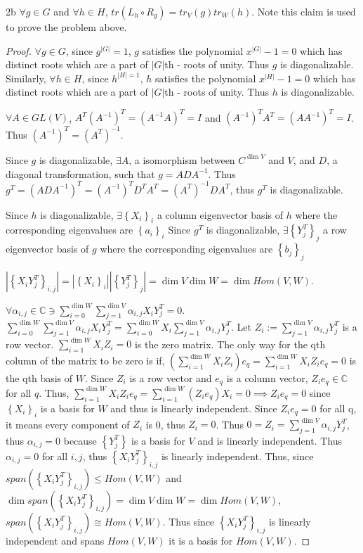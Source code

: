 \documentclass{article}
\newcommand{\C}{\mathbb{C}}
\begin{document}
\begin{claim}{2b}\label{Claim 2b.}
    $\forall g \in G$ and $\forall h \in H$, $tr(L_h \circ R_g) = tr_V(g)tr_W(h)$. Note this claim is used to prove the problem above.   
\end{claim}
\begin{proof}
    $\forall g \in G$, since $g^{|G|} = 1$, $g$ satisfies the polynomial $x^{|G|} - 1 = 0$ which has distinct roots which are a part of $|G|$th - roots of unity. Thus $g$ is diagonalizable. Similarly, $\forall h \in H$, since $h^{|H| = 1}$, $h$ satisfies the polynomial $x^{|H|} - 1 = 0$ which has distinct roots which are a part of $|G|$th - roots of unity. Thus $h$ is diagonalizable.
    
    $\forall A \in GL(V)$, $A^T (A^{-1})^T = (A^{-1}A)^T = I$ and $(A^{-1})^T A^T = (AA^{-1})^T = I$. Thus $(A^{-1})^T = (A^T)^{-1}$.    
    
    Since $g$ is diagonalizable, $\exists A$, a isomorphism between $C^{\dim V}$ and $V$, and $D$, a diagonal transformation, such that $g = ADA^{-1}$. Thus $g^T = (ADA^{-1})^T = (A^{-1})^T D^T A^{T} = (A^T)^{-1} D A^{T}$, thus $g^T$ is diagonalizable.

    Since $h$ is diagonalizable, $\exists \left\{  X_i\right\}_i$ a column eigenvector basis of $h$ where the corresponding eigenvalues are $\left\{ a_i \right\}_i$      
    Since $g^T$ is diagonalizable, $\exists \left\{ Y_j^T \right\}_j$ a row eigenvector basis of $g$ where the corresponding eigenvalues are $\left\{ b_j \right\}_j$
    
    $|\left\{ X_iY_j^T \right\}_{i, j}| = |\left\{ X_i \right\}_i| |\left\{ Y_j^T \right\}_j| = \dim V \dim W = \dim Hom(V, W)$. 
    
    $\forall \alpha_{i, j} \in \C \ni \sum_{i = 0}^{\dim W} \sum_{j = 1}^{\dim V} \alpha_{i, j} X_{i} Y_{j}^T = 0$. $\sum_{i = 0}^{\dim W} \sum_{j = 1}^{\dim V} \alpha_{i, j} X_{i} Y_{j}^T = \sum_{i = 0}^{\dim W} X_{i} \sum_{j = 1}^{\dim V} \alpha_{i, j} Y_{j}^T$. 
    Let $Z_i := \sum_{j = 1}^{\dim V} \alpha_{i, j} Y_{j}^T$ is a row vector. $\sum_{i = 1}^{\dim W} X_iZ_i = 0$ is the zero matrix. The only way for the qth column of the matrix to be zero is if, $(\sum_{i = 1}^{\dim W} X_iZ_i)e_q = \sum_{i = 1}^{\dim W} X_iZ_ie_q = 0$ is the qth basis of $W$. Since $Z_i$ is a row vector and $e_q$ is a column vector, $Z_ie_q \in \C$ for all $q$. Thus, $\sum_{i = 1}^{\dim W} X_iZ_ie_q = \sum_{i = 1}^{\dim W} (Z_ie_q) X_i = 0 \implies Z_ie_q = 0$ since $\left\{ X_i \right\}_i$ is a basis for $W$ and thus is linearly independent. Since $Z_ie_q = 0$ for all q, it means every component of $Z_i$ is 0, thus $Z_i = 0$. Thus $0 = Z_i = \sum_{j = 1}^{\dim V} \alpha_{i, j} Y_j^T$, thus $\alpha_{i, j} = 0$ because $\left\{ Y_j^T \right\}$ is a basis for $V$ and is linearly independent. Thus $\alpha_{i, j} = 0$ for all $i, j$, thus $\left\{ X_i Y_j^T \right\}_{i, j}$ is linearly independent. Thus, since $span(\left\{ X_i Y_j^T \right\}_{i, j}) \leq Hom(V, W)$ and $\dim span(\left\{ X_i Y_j^T \right\}_{i, j}) = \dim V \dim W = \dim Hom(V, W)$, $span(\left\{ X_i Y_j^T \right\}_{i, j}) \cong Hom(V, W)$. Thus since $\left\{ X_i Y_j^T \right\}_{i, j}$ is linearly independent and spans $Hom(V, W)$ it is a basis for $Hom(V, W)$.   
    

\end{proof}
\end{document}
